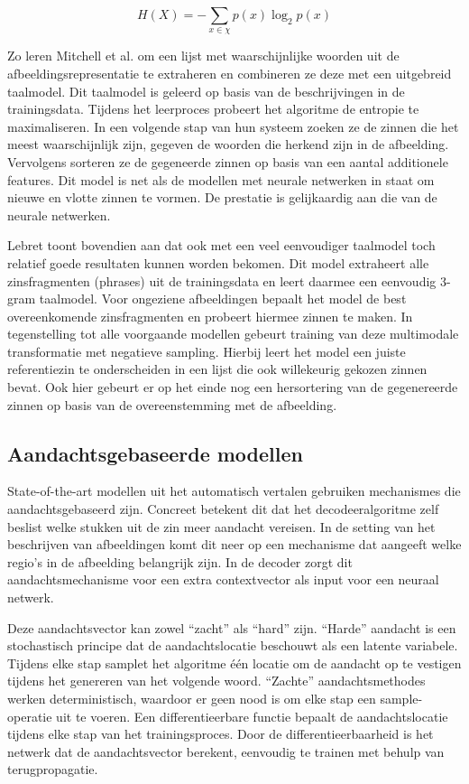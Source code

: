 \begin{equation}
     H(X) = -\sum_{x \in \chi}p(x)\log_2p(x)
     \label{entropy}
 \end{equation} 

Zo leren Mitchell et al.\cite{Mitchell2015} om een lijst met waarschijnlijke woorden uit de afbeeldingsrepresentatie te extraheren en combineren ze deze met een uitgebreid taalmodel. Dit taalmodel is geleerd op basis van de beschrijvingen in de trainingsdata. Tijdens het leerproces probeert het algoritme de entropie te maximaliseren. In een volgende stap van hun systeem zoeken ze de zinnen die het meest waarschijnlijk zijn, gegeven de woorden die herkend zijn in de afbeelding. Vervolgens sorteren ze de gegeneerde zinnen op basis van een aantal additionele features. Dit model is net als de modellen met neurale netwerken in staat om nieuwe en vlotte zinnen te vormen. De prestatie is gelijkaardig aan die van de neurale netwerken.

Lebret\cite{Lebret2015} toont bovendien aan dat ook met een veel eenvoudiger taalmodel toch relatief goede resultaten kunnen worden bekomen. Dit model extraheert alle zinsfragmenten (phrases) uit de trainingsdata en leert daarmee een eenvoudig 3-gram taalmodel. Voor ongeziene afbeeldingen bepaalt het model de best overeenkomende zinsfragmenten en probeert hiermee zinnen te maken. In tegenstelling tot alle voorgaande modellen gebeurt training van deze multimodale transformatie met negatieve sampling. Hierbij leert het model een juiste referentiezin te onderscheiden in een lijst die ook willekeurig gekozen zinnen bevat. Ook hier gebeurt er op het einde nog een hersortering van de gegenereerde zinnen op basis van de overeenstemming met de afbeelding.

\subsection{Aandachtsgebaseerde modellen}
State-of-the-art modellen uit het automatisch vertalen gebruiken mechanismes die aandachtsgebaseerd zijn. Concreet betekent dit dat het decodeeralgoritme zelf beslist welke stukken uit de zin meer aandacht vereisen.
In de setting van het beschrijven van afbeeldingen komt dit neer op een mechanisme dat aangeeft welke regio's in de afbeelding belangrijk zijn. In de decoder zorgt dit aandachtsmechanisme voor een extra contextvector als input voor een neuraal netwerk. 

Deze aandachtsvector kan zowel ``zacht'' als ``hard'' zijn. ``Harde'' aandacht is een stochastisch principe dat de aandachtslocatie beschouwt als een latente variabele. Tijdens elke stap samplet het algoritme \'e\'en locatie om de aandacht op te vestigen tijdens het genereren van het volgende woord. ``Zachte'' aandachtsmethodes werken deterministisch, waardoor er geen nood is om elke stap een sample-operatie uit te voeren. Een differentieerbare functie bepaalt de aandachtslocatie tijdens elke stap van het trainingsproces. Door de differentieerbaarheid is het netwerk dat de aandachtsvector berekent, eenvoudig te trainen met behulp van terugpropagatie.

